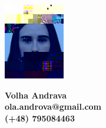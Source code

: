 \documentclass[margin]{res}
\begin{document}
\begin{minipage}{0.35\linewidth}
    \begin{center}
        \includegraphics[width=0.9\linewidth]{photo}
    \end{center}
\end{minipage}
\hfill
\begin{minipage}{0.85\linewidth}
\textbf{Volha Andrava\\}
\textbf{ola.androva@gmail.com \\(+48) 795084463\\}
\end{minipage}
\end{document}
